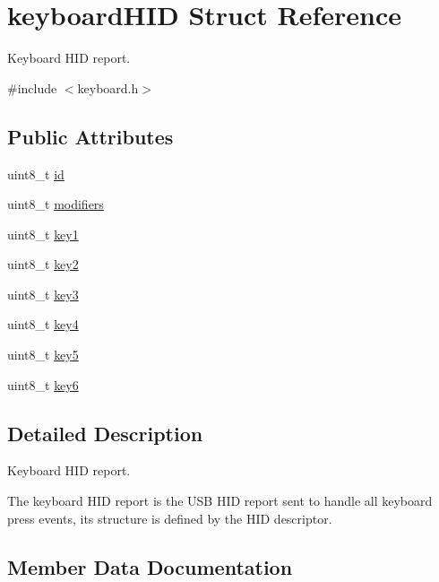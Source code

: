 \hypertarget{structkeyboardHID}{}\section{keyboard\+H\+ID Struct Reference}
\label{structkeyboardHID}


Keyboard H\+ID report.  




{\ttfamily \#include $<$keyboard.\+h$>$}

\subsection*{Public Attributes}
\begin{DoxyCompactItemize}
\item 
uint8\+\_\+t \hyperlink{structkeyboardHID_a34586b90d93b4adbf21bc2a6a5768719}{id}
\item 
uint8\+\_\+t \hyperlink{structkeyboardHID_af9b16f0982275eddfa430dd71fa64825}{modifiers}
\item 
uint8\+\_\+t \hyperlink{group__HID__keys_ga8d13499cb3958bd1513324ecfcc3cea2}{key1}
\item 
uint8\+\_\+t \hyperlink{group__HID__keys_ga32322c276df068828637c99ef9cf7efc}{key2}
\item 
uint8\+\_\+t \hyperlink{group__HID__keys_ga3f5f492cd68dc9ed37c0d5c105efa5c4}{key3}
\item 
uint8\+\_\+t \hyperlink{group__HID__keys_ga92ceb9b21b10f5cb65e70ae2a689b2f3}{key4}
\item 
uint8\+\_\+t \hyperlink{group__HID__keys_gab11bee72b1b28da4b8f0dec2c834a4db}{key5}
\item 
uint8\+\_\+t \hyperlink{group__HID__keys_ga47cb0263b63064de604d637f844af705}{key6}
\end{DoxyCompactItemize}


\subsection{Detailed Description}
Keyboard H\+ID report. 

The keyboard H\+ID report is the U\+SB H\+ID report sent to handle all keyboard press events, its structure is defined by the H\+ID descriptor. 

\subsection{Member Data Documentation}
\mbox{\label{structkeyboardHID_a34586b90d93b4adbf21bc2a6a5768719}} 
